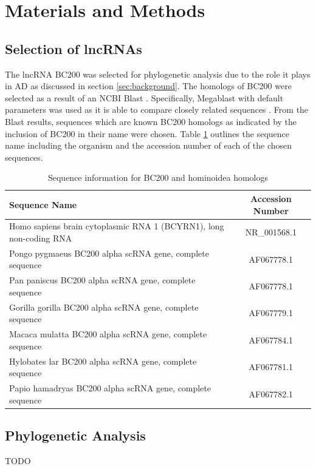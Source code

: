 \documentclass[conference]{IEEEtran}
\begin{document}
\section{Materials and Methods}\label{sec:methods}

\subsection{Selection of lncRNAs}
The lncRNA BC200 was selected for phylogenetic analysis due to the role it plays in AD as discussed in section \ref{sec:background}. 
The homologs of BC200 were selected as a result of an NCBI Blast \cite{blastTool}. Specifically, Megablast \cite{morgulis2008database} with default parameters was used as it is able to compare closely related sequences \cite{amirmahani2018phylogenetic}. 
From the Blast results, sequences which are known BC200 homologs as indicated by the inclusion of BC200 in their name were chosen. 
Table \ref{tbl:accession} outlines the sequence name including the organism and the accession number of each of the chosen sequences. 

\begin{table}[h]
  \centering
  \caption{Sequence information for BC200 and hominoidea homologs}
  \label{tbl:accession}
  \begin{tabular}{lc}
    \toprule
    Sequence Name & Accession Number \\
    \midrule
    Homo sapiens brain cytoplasmic RNA 1 (BCYRN1), long non-coding RNA & NR\_001568.1 \\
    Pongo pygmaeus BC200 alpha scRNA gene, complete sequence           & AF067778.1 \\
    Pan paniscus BC200 alpha scRNA gene, complete sequence             & AF067778.1 \\
    Gorilla gorilla BC200 alpha scRNA gene, complete sequence          & AF067779.1 \\
    Macaca mulatta BC200 alpha scRNA gene, complete sequence           & AF067784.1 \\
    Hylobates lar BC200 alpha scRNA gene, complete sequence            & AF067781.1 \\
    Papio hamadryas BC200 alpha scRNA gene, complete sequence          & AF067782.1 \\
    \bottomrule
  \end{tabular}
\end{table}

\subsection{Phylogenetic Analysis}
TODO
\end{document}
